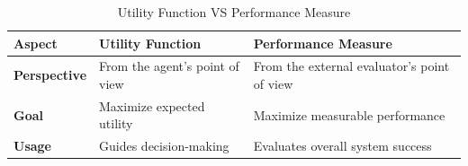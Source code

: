 \begin{customArrayStretch}{1.3}
\begin{table}[H]
\centering

\begin{tabular}{| l | l | l |}

\hline

\textbf{Aspect} &
    \textbf{Utility Function} &
    \textbf{Performance Measure} \\ \hline

\textbf{Perspective} &
    From the agent’s point of view &
    From the external evaluator’s point of view \\ \hline

\textbf{Goal} &
    Maximize expected utility &
    Maximize measurable performance \\ \hline

\textbf{Usage} &
    Guides decision-making &
    Evaluates overall system success \\ \hline

\end{tabular}

\caption*{Utility Function VS Performance Measure}
\end{table}
\end{customArrayStretch}














